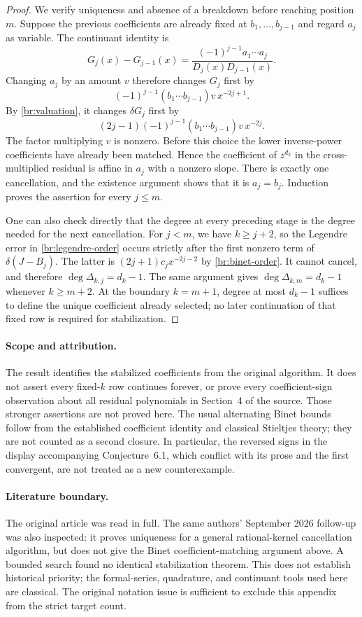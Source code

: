 \documentclass[11pt,a4paper]{article}
\theoremstyle{definition}
\theoremstyle{remark}
\numberwithin{equation}{section}
\begin{document}
\begin{proof}
We verify uniqueness and absence of a breakdown before reaching
position $m$. Suppose the previous coefficients are already fixed
at $b_1,\ldots,b_{j-1}$ and regard $a_j$ as variable.
The continuant identity is
\[
 G_j(x)-G_{j-1}(x)
   =\frac{(-1)^{j-1}a_1\cdots a_j}{D_j(x)D_{j-1}(x)}.
\]
Changing $a_j$ by an amount $v$ therefore changes $G_j$ first by
\[
 (-1)^{j-1}(b_1\cdots b_{j-1})v\,x^{-2j+1}.
\]
By \eqref{br:valuation}, it changes $\delta G_j$ first by
\[
 (2j-1)(-1)^{j-1}(b_1\cdots b_{j-1})v\,x^{-2j}.
\]
The factor multiplying $v$ is nonzero. Before this choice the lower
inverse-power coefficients have already been matched. Hence the
coefficient of $z^{d_k}$ in the cross-multiplied residual is affine
in $a_j$ with a nonzero slope. There is exactly one cancellation,
and the existence argument shows that it is $a_j=b_j$.
Induction proves the assertion for every $j\le m$.

One can also check directly that the degree at every preceding
stage is the degree needed for the next cancellation. For $j<m$,
we have $k\ge j+2$, so the Legendre error in
\eqref{br:legendre-order} occurs strictly after the first nonzero
term of $\delta(J-B_j)$. The latter is
$(2j+1)c_jx^{-2j-2}$ by \eqref{br:binet-order}. It cannot cancel,
and therefore $\deg\Delta_{k,j}=d_k-1$. The same argument gives
$\deg\Delta_{k,m}=d_k-1$ whenever $k\ge m+2$.
At the boundary $k=m+1$, degree at most $d_k-1$ suffices to define
the unique coefficient already selected; no later continuation of
that fixed row is required for stabilization.
\end{proof}

\paragraph{Scope and attribution.}
The result identifies the stabilized coefficients from the original
algorithm. It does not assert every fixed-$k$ row continues forever,
or prove every coefficient-sign observation about all residual
polynomials in Section~4 of the source. Those stronger assertions
are not proved here. The usual alternating Binet bounds follow
from the established coefficient identity and classical Stieltjes
theory; they are not counted as a second closure. In particular, the
reversed signs in the display accompanying Conjecture~6.1, which
conflict with its prose and the first convergent, are not treated as
a new counterexample.

\paragraph{Literature boundary.}
The original article was read in full. The same authors' September 2026
follow-up \cite{BhatnagarRajkumar2026} was also inspected: it proves
uniqueness for a general rational-kernel cancellation algorithm, but
does not give the Binet coefficient-matching argument above.
A bounded search found no identical stabilization theorem. This does
not establish historical priority; the formal-series, quadrature, and
continuant tools used here are classical. The original notation issue
is sufficient to exclude this appendix from the strict target count.
\end{document}
